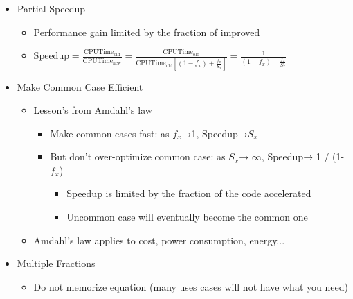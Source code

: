 \documentclass[12pt]{article}
\begin{document}
                \begin{itemize}
                    \item {Partial Speedup}
                        \begin{itemize}
                            \item {Performance gain limited by the fraction of improved}
                            \item {$\text{Speedup}=\frac{\text{CPUTime}_{\text{old}}}{\text{CPUTime}_{\text{new}}}=\frac{\text{CPUTime}_{\text{old}}}{\text{CPUTime}_{\text{old}}\left[\left(1-f_x\right)+\frac{f_x}{S_x}\right]}=\frac{1}{\left(1-f_x\right)+\frac{f_x}{S_x}}$}
                        \end{itemize}
                    \item {Make Common Case Efficient}
                        \begin{itemize}
                            \item {Lesson’s from Amdahl’s law} 
                                \begin{itemize}
                                    \item {Make common cases fast: as $f_x$→1, Speedup→$S_x$}
                                    \item {But don’t over-optimize common case: as $S_x$→ $\infty$, Speedup→ 1 $/$ (1-$f_x$)}
                                        \begin{itemize}
                                            \item {Speedup is limited by the fraction of the code         accelerated}
                                            \item {Uncommon case will eventually become the common one}
                                        \end{itemize}
                                \end{itemize}
                            \item {Amdahl’s law applies to cost, power consumption, energy...}
                        \end{itemize}
                    \item {Multiple Fractions}
                        \begin{itemize}
                            \item {Do not memorize equation (many uses cases will not have what you need)}
                        \end{itemize}
                \end{itemize}
\end{document}
